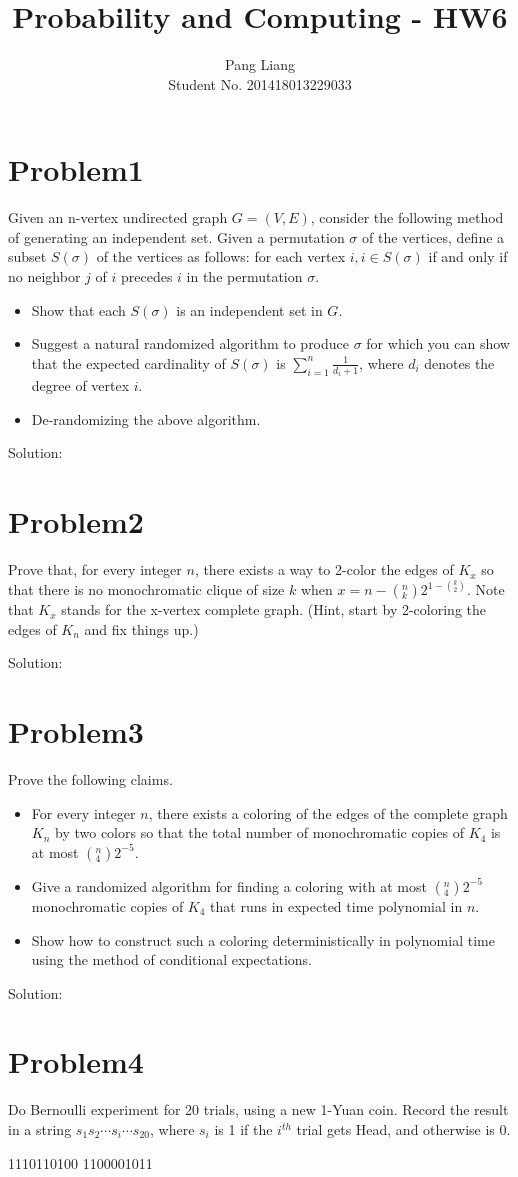 \documentclass[12pt]{article}
\title{Probability and Computing - HW6}
\author{Pang Liang\\ Student No. 201418013229033}
\begin{document}
\maketitle

\section{Problem1}
Given an n-vertex undirected graph $G = (V, E)$, consider the following method of generating an independent set. Given a permutation $\sigma$ of the vertices, define a subset $S(\sigma)$ of the vertices as follows: for each vertex $i, i \in S(\sigma)$ if and only if no neighbor $j$ of $i$ precedes $i$ in the permutation $\sigma$.

\begin{itemize}
\item Show that each $S(\sigma)$ is an independent set in $G$.
\item Suggest a natural randomized algorithm to produce $\sigma$ for which you can show that the expected cardinality of $S(\sigma)$ is $\sum_{i=1}^{n} \frac{1}{d_i+1}$, where $d_i$ denotes the degree of vertex $i$.
\item De-randomizing the above algorithm.
\end{itemize}

Solution:\\


\section{Problem2}
Prove that, for every integer $n$, there exists a way to 2-color the edges of $K_x$ so that there is no monochromatic clique of size $k$ when $x = n - ({}_k^n) 2^{1-({}_2^k)}$. Note that $K_x$ stands for the x-vertex complete graph. (Hint, start by 2-coloring the edges of $K_n$ and fix things up.)

Solution:\\

\section{Problem3}
Prove the following claims.
\begin{itemize}
\item For every integer $n$, there exists a coloring of the edges of the complete graph $K_n$ by two colors so that the total number of monochromatic copies of $K_4$ is at most $({}_4^n) 2^{-5}$.
\item Give a randomized algorithm for finding a coloring with at most $({}_4^n) 2^{-5}$ monochromatic copies of $K_4$ that runs in expected time polynomial in $n$.
\item Show how to construct such a coloring deterministically in polynomial time using the method of conditional expectations.
\end{itemize}

Solution:\\

\section{Problem4}
Do Bernoulli experiment for 20 trials, using a new 1-Yuan coin. Record the result in a
string $s_1s_2 \cdots s_i \cdots s_{20}$, where $s_i$ is 1 if the $i^{th}$ trial gets Head, and otherwise is 0.

1110110100 1100001011
\end{document}
